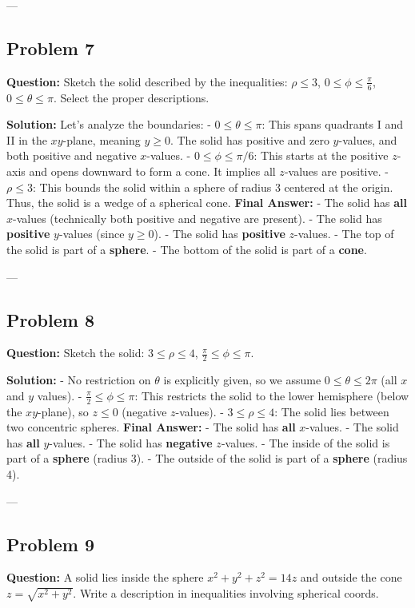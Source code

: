 \documentclass[12pt]{article}
\begin{document}
---

\subsection*{Problem 7}
\textbf{Question:} Sketch the solid described by the inequalities: $\rho \le 3$, $0 \le \phi \le \frac{\pi}{6}$, $0 \le \theta \le \pi$. Select the proper descriptions.

\textbf{Solution:}
Let's analyze the boundaries:
- $0 \le \theta \le \pi$: This spans quadrants I and II in the $xy$-plane, meaning $y \ge 0$. The solid has positive and zero $y$-values, and both positive and negative $x$-values.
- $0 \le \phi \le \pi/6$: This starts at the positive $z$-axis and opens downward to form a cone. It implies all $z$-values are positive.
- $\rho \le 3$: This bounds the solid within a sphere of radius 3 centered at the origin.
Thus, the solid is a wedge of a spherical cone.
\textbf{Final Answer:} 
- The solid has \textbf{all} $x$-values (technically both positive and negative are present).
- The solid has \textbf{positive} $y$-values (since $y \ge 0$).
- The solid has \textbf{positive} $z$-values.
- The top of the solid is part of a \textbf{sphere}.
- The bottom of the solid is part of a \textbf{cone}.

---

\subsection*{Problem 8}
\textbf{Question:} Sketch the solid: $3 \le \rho \le 4$, $\frac{\pi}{2} \le \phi \le \pi$.

\textbf{Solution:}
- No restriction on $\theta$ is explicitly given, so we assume $0 \le \theta \le 2\pi$ (all $x$ and $y$ values).
- $\frac{\pi}{2} \le \phi \le \pi$: This restricts the solid to the lower hemisphere (below the $xy$-plane), so $z \le 0$ (negative $z$-values).
- $3 \le \rho \le 4$: The solid lies between two concentric spheres.
\textbf{Final Answer:}
- The solid has \textbf{all} $x$-values.
- The solid has \textbf{all} $y$-values.
- The solid has \textbf{negative} $z$-values.
- The inside of the solid is part of a \textbf{sphere} (radius 3).
- The outside of the solid is part of a \textbf{sphere} (radius 4).

---

\subsection*{Problem 9}
\textbf{Question:} A solid lies inside the sphere $x^2+y^2+z^2 = 14z$ and outside the cone $z = \sqrt{x^2+y^2}$. Write a description in inequalities involving spherical coords.
\end{document}
